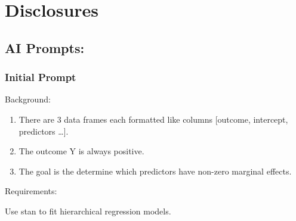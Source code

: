 \documentclass[
  letterpaper,
]{article}
\begin{document}
\pagebreak

\section{Disclosures}\label{disclosures}

\subsection{AI Prompts:}\label{ai-prompts}

\subsubsection{Initial Prompt}\label{initial-prompt}

Background:

\begin{enumerate}
\def\labelenumi{\arabic{enumi}.}
\item
  There are 3 data frames each formatted like columns {[}outcome,
  intercept, predictors \ldots{]}.
\item
  The outcome Y is always positive.
\item
  The goal is the determine which predictors have non-zero marginal
  effects.
\end{enumerate}

Requirements:

Use stan to fit hierarchical regression models.
\end{document}
